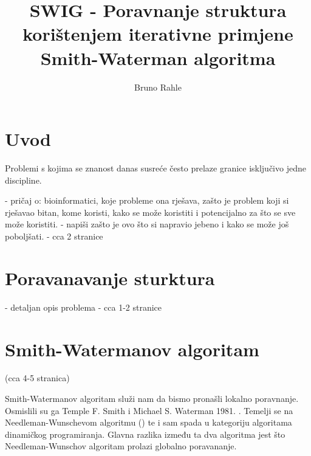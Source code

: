 \documentclass[times, utf8, zavrsni]{fer}
\begin{document}

\title{SWIG - Poravnanje struktura korištenjem iterativne primjene Smith-Waterman algoritma}

\author{Bruno Rahle}

\maketitle

\izvornik

\zahvala{}

\tableofcontents

\listoffigures

\listoftables

\chapter{Uvod}
Problemi s kojima se znanost danas susreće često prelaze granice isključivo
jedne discipline. 

- pričaj o: bioinformatici, koje probleme ona rješava, zašto je problem koji si rješavao bitan,
kome koristi, kako se može koristiti i potencijalno za što se sve može koristiti.
- napiši zašto je ovo što si napravio jebeno i kako se može još poboljšati.
- cca 2 stranice

\chapter{Poravanavanje sturktura}
- detaljan opis problema
- cca 1-2 stranice

\chapter{Smith-Watermanov algoritam}
(cca 4-5 stranica)

Smith-Watermanov algoritam služi nam da bismo pronašli lokalno poravnanje. 
Osmislili su ga Temple F. Smith i Michael S. Waterman 1981. \cite{smithwaterman1981}.
Temelji se na Needleman-Wunschevom algoritmu (\cite{needlemanwunsch1970})
te i sam spada u kategoriju algoritama dinamičkog programiranja. Glavna razlika
između ta dva algoritma jest što Needleman-Wunschov algoritam prolazi globalno
poravananje.
\end{document}
